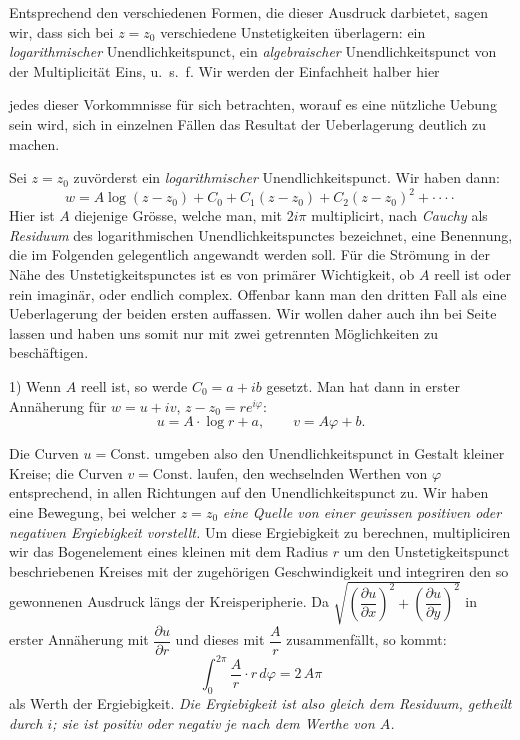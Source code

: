 \documentclass{article}
\begin{document}
Entsprechend den verschiedenen Formen, die dieser Ausdruck darbietet, sagen wir, dass sich bei $z = z_{0}$ verschiedene Unstetigkeiten überlagern: ein \emph{logarithmischer} Unendlichkeitspunct, ein \emph{algebraischer} Unendlichkeitspunct von der Multiplicität Eins, u.\ s.\ f. Wir werden der Einfachheit halber hier

jedes dieser Vorkommnisse für sich betrachten, worauf es eine nützliche Uebung sein wird, sich in einzelnen Fällen das Resultat der Ueberlagerung deutlich zu machen.

Sei $z = z_{0}$ zuvörderst ein \emph{logarithmischer} Unendlichkeitspunct. Wir haben dann:
\[ w = A \log (z - z_{0}) + C_{0} + C_{1} (z - z_{0}) + C_{2} (z - z_{0})^{2} + \cdot\cdot\cdot\cdot \]
Hier ist $A$ diejenige Grösse, welche man, mit $2i\pi$ multiplicirt, nach \emph{Cauchy} als \emph{Residuum} des logarithmischen Unendlichkeitspunctes bezeichnet, eine Benennung, die im Folgenden gelegentlich angewandt werden soll. Für die Strömung in der Nähe des Unstetigkeitspunctes ist es von primärer Wichtigkeit, ob $A$ reell ist oder rein imaginär, oder endlich complex. Offenbar kann man den dritten Fall als eine Ueberlagerung der beiden ersten auffassen. Wir wollen daher auch ihn bei Seite lassen und haben uns somit nur mit zwei getrennten Möglichkeiten zu beschäftigen.

1) Wenn $A$ reell ist, so werde $C_{0} = a + ib$ gesetzt. Man hat dann in erster Annäherung für $w = u + iv$, $z - z_{0} = re^{i\varphi}$:
\[ u = A \cdot \log r + a, \qquad v = A\varphi + b. \]

Die Curven $u = \text{Const.}$ umgeben also den Unendlichkeitspunct in Gestalt kleiner Kreise; die Curven $v = \text{Const.}$ laufen, den wechselnden Werthen von $\varphi$ entsprechend, in allen Richtungen auf den Unendlichkeitspunct zu. Wir haben eine Bewegung, bei welcher $z = z_{0}$ \emph{eine Quelle von einer gewissen positiven oder negativen Ergiebigkeit vorstellt.} Um diese Ergiebigkeit zu berechnen, multipliciren wir das Bogenelement eines kleinen mit dem Radius $r$ um den Unstetigkeitspunct beschriebenen Kreises mit der zugehörigen Geschwindigkeit und integriren den so gewonnenen Ausdruck längs der Kreisperipherie. Da $\sqrt{\left(\dfrac{\partial u}{\partial x}\right)^{2} + \left(\dfrac{\partial u}{\partial y}\right)^{2}}$ in erster Annäherung mit $\dfrac{\partial u}{\partial r}$ und dieses mit $\dfrac{A}{r}$ zusammenfällt, so kommt:
\[ \int_{0}^{2\pi} \frac{A}{r} \cdot r\,d\varphi = 2\,A\pi \]
als Werth der Ergiebigkeit. \emph{Die Ergiebigkeit ist also gleich dem Residuum, getheilt durch $i$; sie ist positiv oder negativ je nach dem Werthe von $A$.}
\end{document}

